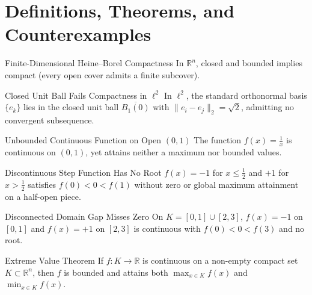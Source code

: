 \documentclass[11pt]{article}
\begin{document}
\section{Definitions, Theorems, and Counterexamples}

\begin{sounddef}[id=def_compact_rn]{Finite-Dimensional Heine--Borel Compactness}
\label{def:hb}
In $\mathbb{R}^n$, closed and bounded implies compact (every open cover admits a finite subcover).
\end{sounddef}

\begin{soundcounterexample}[id=ce_inf_dim_ball]{Closed Unit Ball Fails Compactness in $\ell^2$}
\label{ce:l2}
In $\ell^2$, the standard orthonormal basis $\{e_k\}$ lies in the closed unit ball $\overline{B_1(0)}$ with $\|e_i - e_j\|_2 = \sqrt{2}$, admitting no convergent subsequence.
\end{soundcounterexample}

\begin{soundcounterexample}[id=ce_open_interval]{Unbounded Continuous Function on Open $(0,1)$}
\label{ce:open}
The function $f(x) = \frac{1}{x}$ is continuous on $(0,1)$, yet attains neither a maximum nor bounded values.
\end{soundcounterexample}

\begin{soundcounterexample}[id=ce_jump_discont]{Discontinuous Step Function Has No Root}
\label{ce:jump}
$f(x) = -1$ for $x \le \frac{1}{2}$ and $+1$ for $x > \frac{1}{2}$ satisfies $f(0) < 0 < f(1)$ without zero or global maximum attainment on a half-open piece.
\end{soundcounterexample}

\begin{soundcounterexample}[id=ce_domain_gap]{Disconnected Domain Gap Misses Zero}
\label{ce:gap}
On $K = [0,1] \cup [2,3]$, $f(x) = -1$ on $[0,1]$ and $f(x) = +1$ on $[2,3]$ is continuous with $f(0) < 0 < f(3)$ and no root.
\end{soundcounterexample}

\begin{soundtheorem}[id=thm_evt]{Extreme Value Theorem}
\label{thm:evt}
If $f: K \to \mathbb{R}$ is continuous on a non-empty compact set $K \subset \mathbb{R}^n$, then $f$ is bounded and attains both $\max_{x \in K} f(x)$ and $\min_{x \in K} f(x)$.
\end{soundtheorem}
\end{document}
